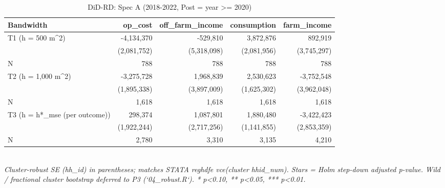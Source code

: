 \begin{table}[t]
\centering
\caption{DiD-RD: Spec A (2018-2022, Post = year >= 2020)}
\label{tab:main_specA_en}
\begin{tabular}{lrrrr}
\toprule
Bandwidth & op_cost & off_farm_income & consumption & farm_income \\
\midrule
T1 (h = 500 m^2) & -4,134,370 & -529,810 & 3,872,876 & 892,919 \\
        & (2,081,752) & (5,318,098) & (2,081,956) & (3,745,297) \\
N       & 788 & 788 & 788 & 788 \\
T2 (h = 1,000 m^2) & -3,275,728 & 1,968,839 & 2,530,623 & -3,752,548 \\
        & (1,895,338) & (3,897,009) & (1,625,302) & (3,962,048) \\
N       & 1,618 & 1,618 & 1,618 & 1,618 \\
T3 (h = h*_mse (per outcome)) & 298,374 & 1,087,801 & 1,880,480 & -3,422,423 \\
        & (1,922,244) & (2,717,256) & (1,141,855) & (2,853,359) \\
N       & 2,780 & 3,310 & 3,135 & 4,210 \\
\bottomrule
\end{tabular}
\\
\footnotesize\textit{Cluster-robust SE (hh_id) in parentheses; matches STATA reghdfe vce(cluster hhid_num). Stars = Holm step-down adjusted p-value. Wild / fractional cluster bootstrap deferred to P3 (`04_robust.R`). * p<0.10, ** p<0.05, *** p<0.01.}
\end{table}

